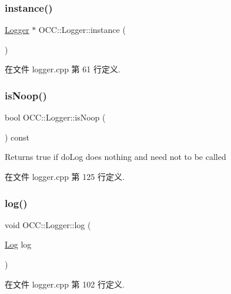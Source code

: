 \subsubsection{\texorpdfstring{instance()}{instance()}}
{\footnotesize\ttfamily \hyperlink{class_o_c_c_1_1_logger}{Logger} $\ast$ O\+C\+C\+::\+Logger\+::instance (\begin{DoxyParamCaption}{ }\end{DoxyParamCaption})\hspace{0.3cm}{\ttfamily [static]}}



在文件 logger.\+cpp 第 61 行定义.

\mbox{\label{class_o_c_c_1_1_logger_ac5345e3ebe1dbdec237ab27cea140a9d}} 
\subsubsection{\texorpdfstring{is\+Noop()}{isNoop()}}
{\footnotesize\ttfamily bool O\+C\+C\+::\+Logger\+::is\+Noop (\begin{DoxyParamCaption}{ }\end{DoxyParamCaption}) const}

Returns true if do\+Log does nothing and need not to be called 

在文件 logger.\+cpp 第 125 行定义.

\mbox{\label{class_o_c_c_1_1_logger_a63b911b609af1a4d550219661be6ca5b}} 
\subsubsection{\texorpdfstring{log()}{log()}}
{\footnotesize\ttfamily void O\+C\+C\+::\+Logger\+::log (\begin{DoxyParamCaption}\item[{\hyperlink{struct_o_c_c_1_1_log}{Log}}]{log }\end{DoxyParamCaption})}



在文件 logger.\+cpp 第 102 行定义.

\mbox{\label{class_o_c_c_1_1_logger_a20cd402d4dde88f8d26384638ada722c}} 
